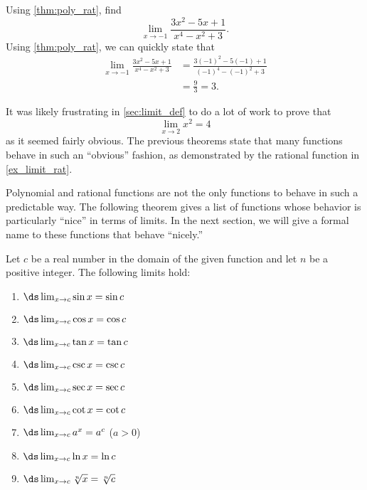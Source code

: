 \begin{example}\label{ex_limit_rat}
Using \autoref{thm:poly_rat}, find\vspace{-.3\baselineskip}
\[\lim_{x\to -1} \frac{3x^2-5x+1}{x^4-x^2+3}.\]
\solution
Using \autoref{thm:poly_rat}, we can quickly state that 
	\begin{align*}
		\lim_{x\to -1}\frac{3x^2-5x+1}{x^4-x^2+3}
		&= \frac{3(-1)^2-5(-1)+1}{(-1)^4-(-1)^2+3} \\
		&= \frac{9}{3} =3.
	\end{align*}
\end{example}

It was likely frustrating in \autoref{sec:limit_def} to do a lot of work to prove that
\[\lim_{x\to 2} x^2 = 4\]
as it seemed fairly obvious. The previous theorems state that many functions behave in such an ``obvious'' fashion, as demonstrated by the rational function in \autoref{ex_limit_rat}. 

Polynomial and rational functions are not the only functions to behave in such a predictable way. The following theorem gives a list of functions whose behavior is particularly ``nice'' in terms of limits. In the next section, we will give a formal name to these functions that behave ``nicely.''

{
\begin{theorem}\label{thm:lim_continuous}
Let $c$ be a real number in the domain of the given function and let $n$ be a positive integer. The following limits hold:
\begin{multicols}{3}
\begin{enumerate}
\item	$\ds \lim_{x\to c} \sin x = \sin c$
\item	$\ds \lim_{x\to c} \cos x = \cos c$
\item	$\ds \lim_{x\to c} \tan x = \tan c$
\item	$\ds \lim_{x\to c} \csc x = \csc c$
\item	$\ds \lim_{x\to c} \sec x = \sec c$
\item	$\ds \lim_{x\to c} \cot x = \cot c$
\item	$\ds \lim_{x\to c} a^x = a^c$ ($a>0$)
\item	$\ds \lim_{x\to c} \ln x = \ln c$
\item	$\ds \lim_{x\to c} \sqrt[n]{x} = \sqrt[n]{c}$
\end{enumerate}
\end{multicols}
\end{theorem}
}

